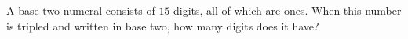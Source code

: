 A base-two numeral consists of $15$ digits, all of which are ones. When this number is tripled and written in base two, how many digits does it have?
